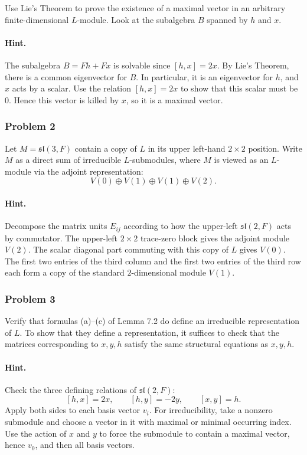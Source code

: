 \documentclass[12pt, a4paper]{article}
\begin{document}
Use Lie's Theorem to prove the existence of a maximal vector in an arbitrary
finite-dimensional \(L\)-module. Look at the subalgebra \(B\) spanned by
\(h\) and \(x\).

\paragraph{Hint.}
The subalgebra \(B=Fh+Fx\) is solvable since \([h,x]=2x\). By Lie's Theorem,
there is a common eigenvector for \(B\). In particular, it is an eigenvector
for \(h\), and \(x\) acts by a scalar. Use the relation \([h,x]=2x\) to show
that this scalar must be \(0\). Hence this vector is killed by \(x\), so it is
a maximal vector.

\subsubsection{Problem 2}

Let \(M=\mathfrak{sl}(3,F)\) contain a copy of \(L\) in its upper left-hand
\(2\times 2\) position. Write \(M\) as a direct sum of irreducible
\(L\)-submodules, where \(M\) is viewed as an \(L\)-module via the adjoint
representation:
\[
V(0)\oplus V(1)\oplus V(1)\oplus V(2).
\]

\paragraph{Hint.}
Decompose the matrix units \(E_{ij}\) according to how the upper-left
\(\mathfrak{sl}(2,F)\) acts by commutator. The upper-left \(2\times 2\)
trace-zero block gives the adjoint module \(V(2)\). The scalar diagonal part
commuting with this copy of \(L\) gives \(V(0)\). The first two entries of the
third column and the first two entries of the third row each form a copy of
the standard \(2\)-dimensional module \(V(1)\).

\subsubsection{Problem 3}

Verify that formulas (a)--(c) of Lemma 7.2 do define an irreducible
representation of \(L\). To show that they define a representation, it suffices
to check that the matrices corresponding to \(x,y,h\) satisfy the same
structural equations as \(x,y,h\).

\paragraph{Hint.}
Check the three defining relations of \(\mathfrak{sl}(2,F)\):
\[
[h,x]=2x,\qquad [h,y]=-2y,\qquad [x,y]=h.
\]
Apply both sides to each basis vector \(v_i\). For irreducibility, take a
nonzero submodule and choose a vector in it with maximal or minimal occurring
index. Use the action of \(x\) and \(y\) to force the submodule to contain a
maximal vector, hence \(v_0\), and then all basis vectors.
\end{document}
